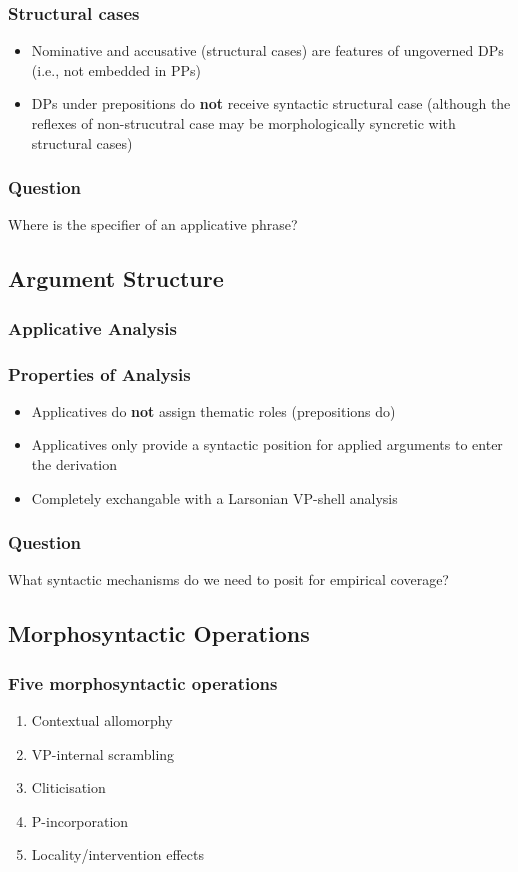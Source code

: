 \documentclass{beamer}
\begin{document}
\begin{frame}
	\frametitle{Structural cases}
	\begin{itemize}
		\item Nominative and accusative (structural cases) are features of ungoverned DPs (i.e., not embedded in PPs)
		\item DPs under prepositions do \textbf{not} receive syntactic structural case (although the reflexes of non-strucutral case may be morphologically syncretic with structural cases)
	\end{itemize}
\end{frame}

\begin{frame}
	\frametitle{Question}
	\vfill
	\Large
	Where is the specifier of an applicative phrase?
	\vfill
\end{frame}
\subsection{Argument Structure}
\begin{frame}
	\frametitle{Applicative Analysis}
\end{frame}

\begin{frame}
	\frametitle{Properties of Analysis}
	\begin{itemize}
		\item Applicatives do \textbf{not} assign thematic roles (prepositions do)
		\item Applicatives only provide a syntactic position for applied arguments to enter the derivation
		\item Completely exchangable with a Larsonian VP-shell analysis \citep{Larson.1988}
	\end{itemize}
\end{frame}

\begin{frame}
	\frametitle{Question}
	\vfill
	\Large
		What syntactic mechanisms do we need to posit for empirical coverage?
	\vfill
\end{frame}
\subsection{Morphosyntactic Operations}
\begin{frame}
	\frametitle{Five morphosyntactic operations}
	\begin{enumerate}
		\item Contextual allomorphy
		\item VP-internal scrambling
		\item Cliticisation
		\item P-incorporation
		\item Locality/intervention effects
	\end{enumerate}
\end{frame}
\end{document}
